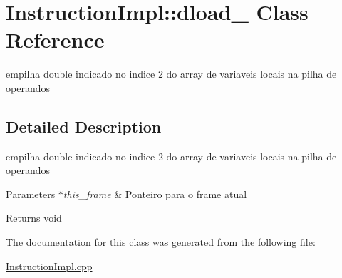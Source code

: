 \hypertarget{class_instruction_impl_1_1dload__2}{}\section{Instruction\+Impl\+:\+:dload\+\_ Class Reference}
\label{class_instruction_impl_1_1dload__2}


empilha double indicado no indice 2 do array de variaveis locais na pilha de operandos  




\subsection{Detailed Description}
empilha double indicado no indice 2 do array de variaveis locais na pilha de operandos 


\begin{DoxyParams}{Parameters}
{\em $\ast$this\+\_\+frame} & Ponteiro para o frame atual \\
\hline
\end{DoxyParams}
\begin{DoxyReturn}{Returns}
void 
\end{DoxyReturn}


The documentation for this class was generated from the following file\+:\begin{DoxyCompactItemize}
\item 
\hyperlink{_instruction_impl_8cpp}{Instruction\+Impl.\+cpp}\end{DoxyCompactItemize}
